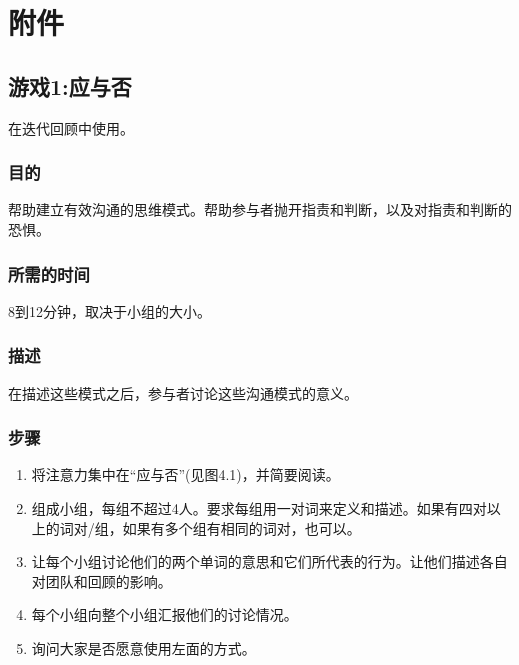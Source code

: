 \hypertarget{ux9644ux4ef6}{%
\section{附件}\label{ux9644ux4ef6}}


\hypertarget{ux6e38ux620f1ux5e94ux4e0eux5426}{%
\subsection{游戏1:应与否}\label{ux6e38ux620f1ux5e94ux4e0eux5426}}

在迭代回顾中使用。

\hypertarget{ux76eeux7684}{%
\subsubsection{目的}\label{ux76eeux7684}}

帮助建立有效沟通的思维模式。帮助参与者抛开指责和判断，以及对指责和判断的恐惧。

\hypertarget{ux6240ux9700ux7684ux65f6ux95f4}{%
\subsubsection{所需的时间}\label{ux6240ux9700ux7684ux65f6ux95f4}}

8到12分钟，取决于小组的大小。

\hypertarget{ux63cfux8ff0}{%
\subsubsection{描述}\label{ux63cfux8ff0}}

在描述这些模式之后，参与者讨论这些沟通模式的意义。

\hypertarget{ux6b65ux9aa4}{%
\subsubsection{步骤}\label{ux6b65ux9aa4}}

\begin{enumerate}
\tightlist
\item
  将注意力集中在``应与否''(见图4.1)，并简要阅读。
\item
  组成小组，每组不超过4人。要求每组用一对词来定义和描述。如果有四对以上的词对/组，如果有多个组有相同的词对，也可以。
\item
  让每个小组讨论他们的两个单词的意思和它们所代表的行为。让他们描述各自对团队和回顾的影响。
\item
  每个小组向整个小组汇报他们的讨论情况。
\item
  询问大家是否愿意使用左面的方式。
\end{enumerate}


